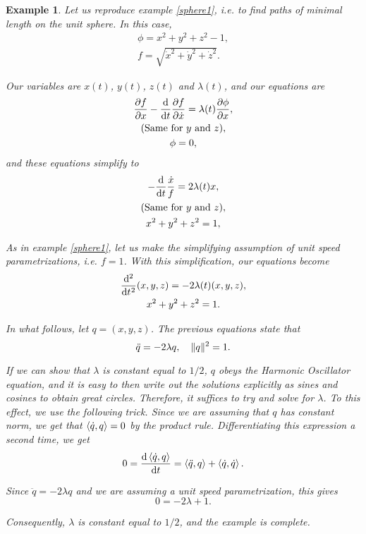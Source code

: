 \documentclass{article}
\theoremstyle{plain}
\newtheorem{example}{Example}
\theoremstyle{nonumberplain}
\DeclarePairedDelimiter\norm{\lVert}{\rVert}
\begin{document}
\begin{example}
Let us reproduce example \ref{sphere1}, i.e. to find paths of minimal length on the unit sphere.  In this case,
\begin{gather*}
\phi = x^2 + y^2 + z^2 - 1,\\
f = \sqrt{\dot x^2 + \dot y^2 + \dot z^2}.
\end{gather*}

Our variables are $x(t)$, $y(t)$, $z(t)$ and $\lambda(t)$, and our equations are
\begin{gather*}
\diffp f x - \diff*{\diffp f {\dot x}}t = \lambda(t) \diffp \phi x,\\
\text{(Same for $y$ and $z$)},\\
\phi = 0,
\end{gather*}
and these equations simplify to
\begin{gather*}
- \diff*{\frac{\dot x}f}t = 2 \lambda(t) x,\\
\text{(Same for $y$ and $z$)},\\
x^2 + y^2 + z^2 = 1,
\end{gather*}

As in example \ref{sphere1}, let us make the simplifying assumption of unit speed parametrizations, i.e. $f = 1$. With this simplification, our equations become
\begin{gather*}
\diff*[2]{(x,y,z)}{t} = -2 \lambda(t) (x,y,z),\\
x^2 + y^2 + z^2 = 1.
\end{gather*}

In what follows, let $q = (x,y,z)$. The previous equations state that
\[\ddot q = - 2 \lambda q, \quad \norm{q}^2 = 1.\]

If we can show that $\lambda$ is constant equal to $1/2$, $q$ obeys the Harmonic Oscillator equation, and it is easy to then write out the solutions explicitly as sines and cosines to obtain great circles. Therefore, it suffices to try and solve for $\lambda$. To this effect, we use the following trick. Since we are assuming that $q$ has constant norm, we get that $\braket{\dot q, q} = 0$ by the product rule. Differentiating this expression a second time, we get
\[0 = \diff{\braket{\dot q, q}}t = \braket{\ddot q, q} + \braket{\dot q, \dot q}.\]

Since $\ddot q = - 2 \lambda q$ and we are assuming a unit speed parametrization, this gives
\[0 = - 2 \lambda + 1.\]

Consequently, $\lambda$ is constant equal to $1/2$, and the example is complete.
\end{example}
\end{document}
